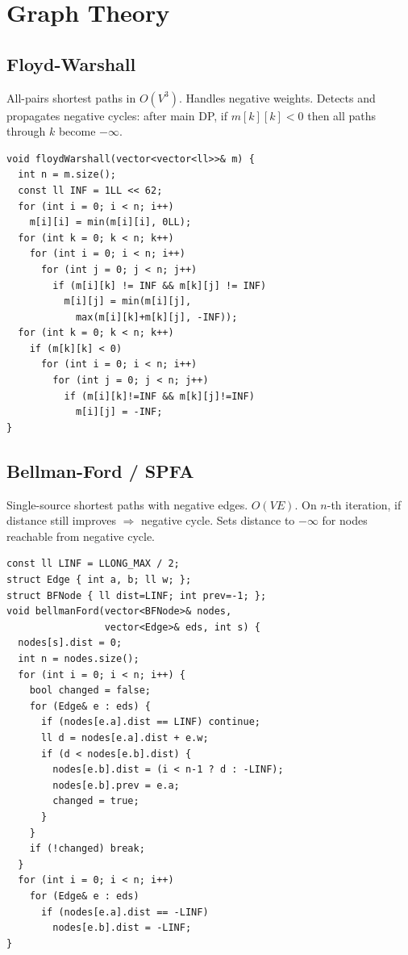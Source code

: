 \section{Graph Theory}

\subsection{Floyd-Warshall}
All-pairs shortest paths in $O(V^3)$. Handles negative weights. Detects and propagates negative cycles: after main DP, if $m[k][k] < 0$ then all paths through $k$ become $-\infty$.
\begin{verbatim}
void floydWarshall(vector<vector<ll>>& m) {
  int n = m.size();
  const ll INF = 1LL << 62;
  for (int i = 0; i < n; i++)
    m[i][i] = min(m[i][i], 0LL);
  for (int k = 0; k < n; k++)
    for (int i = 0; i < n; i++)
      for (int j = 0; j < n; j++)
        if (m[i][k] != INF && m[k][j] != INF)
          m[i][j] = min(m[i][j],
            max(m[i][k]+m[k][j], -INF));
  for (int k = 0; k < n; k++)
    if (m[k][k] < 0)
      for (int i = 0; i < n; i++)
        for (int j = 0; j < n; j++)
          if (m[i][k]!=INF && m[k][j]!=INF)
            m[i][j] = -INF;
}
\end{verbatim}
\subsection{Bellman-Ford / SPFA}
Single-source shortest paths with negative edges. $O(VE)$. On $n$-th iteration, if distance still improves $\Rightarrow$ negative cycle. Sets distance to $-\infty$ for nodes reachable from negative cycle.
\begin{verbatim}
const ll LINF = LLONG_MAX / 2;
struct Edge { int a, b; ll w; };
struct BFNode { ll dist=LINF; int prev=-1; };
void bellmanFord(vector<BFNode>& nodes,
                 vector<Edge>& eds, int s) {
  nodes[s].dist = 0;
  int n = nodes.size();
  for (int i = 0; i < n; i++) {
    bool changed = false;
    for (Edge& e : eds) {
      if (nodes[e.a].dist == LINF) continue;
      ll d = nodes[e.a].dist + e.w;
      if (d < nodes[e.b].dist) {
        nodes[e.b].dist = (i < n-1 ? d : -LINF);
        nodes[e.b].prev = e.a;
        changed = true;
      }
    }
    if (!changed) break;
  }
  for (int i = 0; i < n; i++)
    for (Edge& e : eds)
      if (nodes[e.a].dist == -LINF)
        nodes[e.b].dist = -LINF;
}
\end{verbatim}
